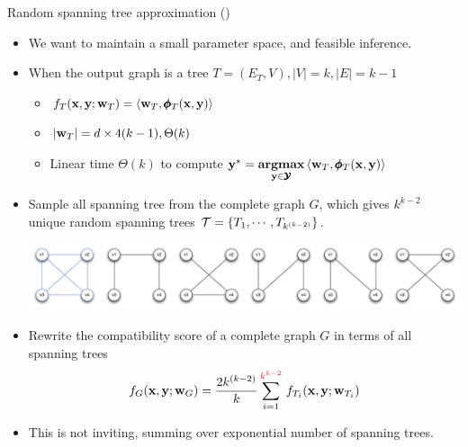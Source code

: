 \documentclass[first=dgreen,second=purple,logo=yellowexc]{aaltoslides}
\begin{document}
{\begin{frame}{Random spanning tree approximation (\rta)}
	\begin{itemize}
		\item We want to maintain a small parameter space, and feasible inference.
		\item When the output graph is a tree $T=(E_T,V), |V|=k, |E|=k-1$
		\begin{itemize}
			\footnotesize
			\item $f_T(\mathbf {x},\mathbf {y};\mathbf {w}_T) = \langle \mathbf {w}_T, \pmb \phi_T(\mathbf {x},\mathbf {y}) \rangle$
			\item $|\mathbf {w}_T| = d\times4(k-1), \Theta(k)$
			\item Linear time $\Theta(k)$ to compute $\mathbf {y}^* = \underset{\mathbf {y}\in\pmb {\mathcal{Y}}}{\textbf{argmax}}\, \langle \mathbf {w}_T, \pmb \phi_T(\mathbf {x},\mathbf {y}) \rangle$
		\end{itemize}
		\item Sample all spanning tree from the complete graph $G$, which gives $k^{k-2}$ unique random spanning trees $\mathcal{T} = \{T_1,\cdots,T_{k^{(k-2)}}\}$.
		\begin{center}
			\includegraphics[scale=0.2]{./figures/spanningtrees.pdf}
		\end{center}
		\item Rewrite the compatibility score of a complete graph $G$ in terms of all spanning trees
		\begin{align*}
			f_G(\vx,\vy;\vw_G) = \frac{2k^{(k-2)}}{k}\sum_{i=1}^{{\color{aaltored}k^{k-2}}}\,f_{T_i}(\vx,\vy;\vw_{T_i})
		\end{align*}
		\item This is not inviting, summing over exponential number of spanning trees.
	\end{itemize}
\end{frame}

}
\end{document}
